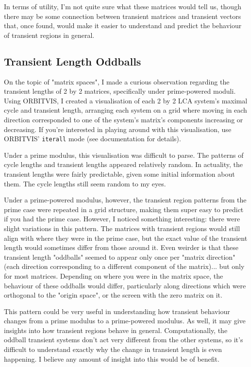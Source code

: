 \documentclass[a4paper, 12pt, reqno]{amsart}
\newcommand{\ssubsection}[1]{\vspace{0.25cm}\subsection{#1}}
\begin{document}
			In terms of utility, I'm not quite sure what these matrices would tell us, though there may be some connection
			between transient matrices and transient vectors that, once found, would make it easier to understand and
			predict the behaviour of transient regions in general.
		
		\ssubsection{Transient Length Oddballs}
			On the topic of "matrix spaces", I made a curious observation regarding the transient lengths of 2 by 2 matrices,
			specifically under prime-powered moduli. Using ORBITVIS, I created a visualisation of each 2 by 2 LCA system's
			maximal cycle and transient length, arranging each system on a grid where moving in each direction corresponded to
			one of the system's matrix's components increasing or decreasing. If you're interested in playing around with this
			visualisation, use ORBITVIS' \texttt{iterall} mode (see documentation for details).
			
			Under a prime modulus, this visualisation was difficult to parse. The patterns of cycle lengths and transient
			lengths appeared relatively random. In actuality, the transient lengths were fairly predictable, given some initial
			information about them. The cycle lengths still seem random to my eyes.
			
			Under a prime-powered modulus, however, the transient region patterns from the prime case were repeated in a grid 
			structure, making them super easy to predict if you had the prime case. However, I noticed something interesting:
			there were slight variations in this pattern. The matrices with transient regions would still align with where
			they were in the prime case, but the exact value of the transient length would sometimes differ from those around
			it. Even weirder is that these transient length "oddballs" seemed to appear only once per "matrix direction" (each
			direction corresponding to a different component of the matrix)... but only for most matrices. Depending on where
			you were in the matrix space, the behaviour of these oddballs would differ, particularly along directions which were
			orthogonal to the "origin space", or the screen with the zero matrix on it.
			
			This pattern could be very useful in understanding how transient behaviour changes from a prime modulus to a
			prime-powered modulus. As well, it may give insights into how transient regions behave in general. Computationally,
			the oddball transient systems don't act very different from the other systems, so it's difficult to understand
			exactly why the change in transient length is even happening. I believe any amount of insight into this would be
			of benefit.
			
\end{document}
